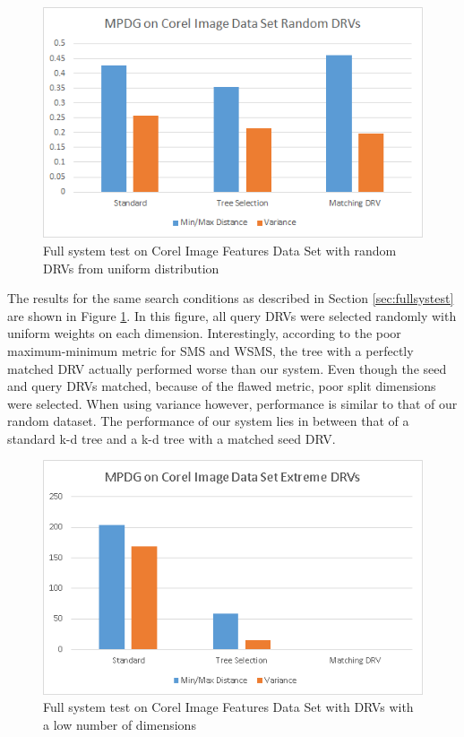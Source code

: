 \begin{figure}[h]
\begin{center}
\includegraphics[width=.85\textwidth]{Figures/altrand}
\end{center}
\caption{Full system test on Corel Image Features Data Set with random DRVs from uniform distribution}
\label{fig:altrand}
\end{figure}

The results for the same search conditions as described in Section \ref{sec:fullsystest} are shown in Figure \ref{fig:altrand}.  In this figure, all query DRVs were selected randomly with uniform weights on each dimension.  Interestingly, according to the poor maximum-minimum metric for SMS and WSMS, the tree with a perfectly matched DRV actually performed worse than our system.  Even though the seed and query DRVs matched, because of the flawed metric, poor split dimensions were selected.  When using variance however, performance is similar to that of our random dataset.  The performance of our system lies in between that of a standard k-d tree and a k-d tree with a matched seed DRV.

\begin{figure}[h]
\begin{center}
\includegraphics[width=.85\textwidth]{Figures/altext}
\end{center}
\caption{Full system test on Corel Image Features Data Set with DRVs with a low number of dimensions}
\label{fig:altext}
\end{figure}

